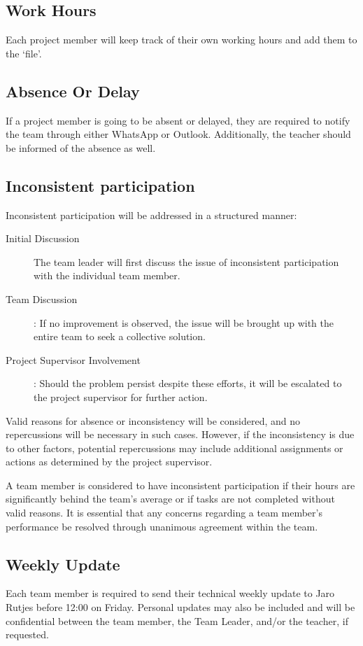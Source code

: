\documentclass{projdoc}
\begin{document}
\subsection{Work Hours}
Each project member will keep track of their own working hours and 
add them to the `file'.

\subsection{Absence Or Delay}
If a project member is going to be absent or delayed, they are required to 
notify the team through either WhatsApp or Outlook. Additionally, the teacher 
should be informed of the absence as well.

\subsection{Inconsistent participation}
Inconsistent participation will be addressed in a structured manner:

\begin{description}
	\item[Initial Discussion] The team leader will first discuss the 
	issue of inconsistent participation with the individual team member.
	\item [Team Discussion]: If no improvement is observed, the issue 
	will be brought up with the entire team to seek a collective solution.
	\item [Project Supervisor Involvement]: Should the problem persist 
	despite these efforts, it will be escalated to the project supervisor for 
	further action.
\end{description}

Valid reasons for absence or inconsistency will be considered, and no 
repercussions will be necessary in such cases. However, if the inconsistency is 
due to other factors, potential repercussions may include additional assignments
 or actions as determined by the project supervisor.
 
A team member is considered to have inconsistent participation if their hours 
are significantly behind the team’s average or if tasks are not completed 
without valid reasons. It is essential that any concerns regarding a team 
member's performance be resolved through unanimous agreement within the team.


\subsection{Weekly Update}
Each team member is required to send their technical weekly update to Jaro 
Rutjes before 12:00 on Friday. Personal updates may also be included and will be
 confidential between the team member, the Team Leader, and/or the teacher, if 
 requested.
\end{document}
